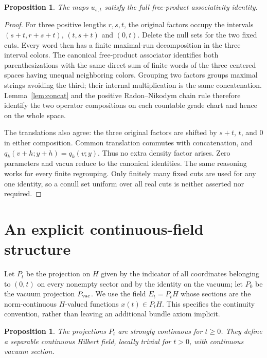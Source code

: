 \documentclass[11pt]{article}
\newtheorem{proposition}[theorem]{Proposition}
\theoremstyle{remark}\newtheorem{remark}[theorem]{Remark}
\begin{document}
\begin{proposition}\label{prop:assoc}
The maps $u_{s,t}$ satisfy the full free-product associativity identity.
\end{proposition}

\begin{proof}
For three positive lengths $r,s,t$, the original factors occupy the intervals
$(s+t,r+s+t)$, $(t,s+t)$ and $(0,t)$. Delete the null sets for the two
fixed cuts. Every word then has a finite maximal-run decomposition in the
three interval colors. The canonical free-product associator identifies both
parenthesizations with the same direct sum of finite words of the three
centered spaces having unequal neighboring colors. Grouping two factors
groups maximal strings avoiding the third; their internal multiplication is
the same concatenation. Lemma~\ref{lem:concat} and the positive
Radon--Nikodym chain rule therefore identify the two operator compositions on
each countable grade chart and hence on the whole space.

The translations also agree: the three original factors are shifted by
$s+t$, $t$, and $0$ in either composition. Common translation commutes with
concatenation, and $q_k(v+h;y+h)=q_k(v;y)$. Thus no extra density factor
arises. Zero parameters and vacua reduce to the canonical identities. The
same reasoning works for every finite regrouping. Only finitely many fixed
cuts are used for any one identity, so a conull set uniform over all real
cuts is neither asserted nor required.
\end{proof}

\section{An explicit continuous-field structure}\label{sec:continuity}

Let $P_t$ be the projection on $H$ given by the indicator of all coordinates
belonging to $(0,t)$ on every nonempty sector and by the identity on the
vacuum; let $P_0$ be the vacuum projection $P_{\rm vac}$. We use the field
$E_t=P_tH$ whose sections are the norm-continuous $H$-valued functions
$x(t)\in P_tH$. This specifies the continuity convention, rather than
leaving an additional bundle axiom implicit.

\begin{proposition}\label{prop:field}
The projections $P_t$ are strongly continuous for $t\geq0$. They define a
separable continuous Hilbert field, locally trivial for $t>0$, with continuous
vacuum section.
\end{proposition}
\end{document}
